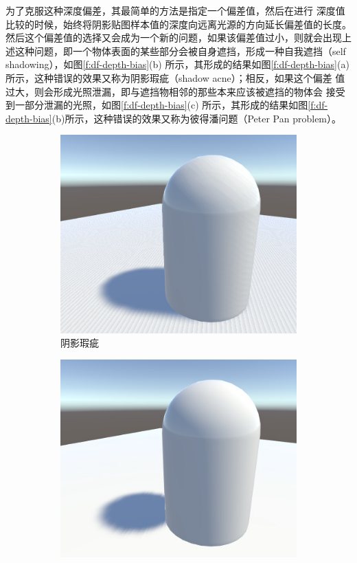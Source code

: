 为了克服这种深度偏差，其最简单的方法是指定一个偏差值，然后在进行 深度值比较的时候，始终将阴影贴图样本值的深度向远离光源的方向延长偏差值的长度。然后这个偏差值的选择又会成为一个新的问题，如果该偏差值过小，则就会出现上述这种问题，即一个物体表面的某些部分会被自身遮挡，形成一种自我遮挡（self shadowing），如图\ref{f:df-depth-bias}(b) 所示，其形成的结果如图\ref{f:df-depth-bias}(a) 所示，这种错误的效果又称为阴影瑕疵（shadow acne）；相反，如果这个偏差 值过大，则会形成光照泄漏，即与遮挡物相邻的那些本来应该被遮挡的物体会 接受到一部分泄漏的光照，如图\ref{f:df-depth-bias}(c) 所示，其形成的结果如图\ref{f:df-depth-bias}(b)所示，这种错误的效果又称为彼得潘问题（Peter Pan problem）。

\begin{figure}
	\begin{subfigure}[b]{0.5\textwidth}
		\includegraphics[width=\textwidth]{figures/shadows/ShadowBiasAcne}
		\caption{阴影瑕疵}
	\end{subfigure}
	\begin{subfigure}[b]{0.5\textwidth}
		\includegraphics[width=\textwidth]{figures/shadows/ShadowBiasPeterPanning}

\end{subfigure}
\end{figure}
